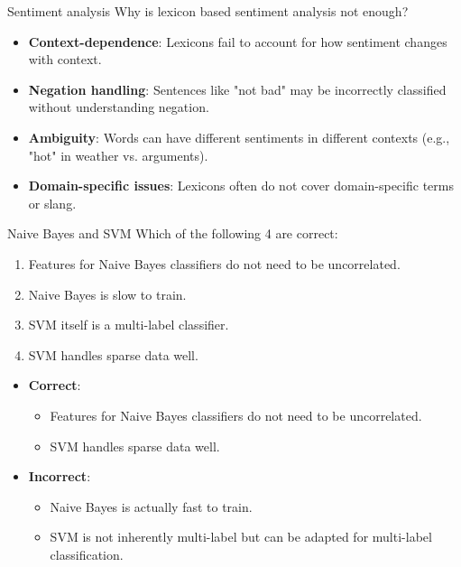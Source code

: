 \documentclass{article}
\begin{document}
\begin{exercise}{Sentiment analysis}
  Why is lexicon based sentiment analysis not enough?

  \begin{solution}
    \begin{itemize}
        \item \textbf{Context-dependence}: Lexicons fail to account for how sentiment changes with context.
        \item \textbf{Negation handling}: Sentences like "not bad" may be incorrectly classified without understanding negation.
        \item \textbf{Ambiguity}: Words can have different sentiments in different contexts (e.g., "hot" in weather vs. arguments).
        \item \textbf{Domain-specific issues}: Lexicons often do not cover domain-specific terms or slang.
    \end{itemize}
  \end{solution}
\end{exercise}

\begin{exercise}{Naive Bayes and SVM}
  Which of the following 4 are correct:
  \begin{enumerate}
    \item Features for Naive Bayes classifiers do not need to be uncorrelated.
    \item Naive Bayes is slow to train.
    \item SVM itself is a multi-label classifier.
    \item SVM handles sparse data well.
  \end{enumerate}

  \begin{solution}
    \begin{itemize}
        \item \textbf{Correct}: 
        \begin{itemize}
            \item Features for Naive Bayes classifiers do not need to be uncorrelated.
            \item SVM handles sparse data well.
        \end{itemize}
        \item \textbf{Incorrect}:
        \begin{itemize}
            \item Naive Bayes is actually fast to train.
            \item SVM is not inherently multi-label but can be adapted for multi-label classification.
        \end{itemize}
    \end{itemize}
  \end{solution}
\end{exercise}
\end{document}

